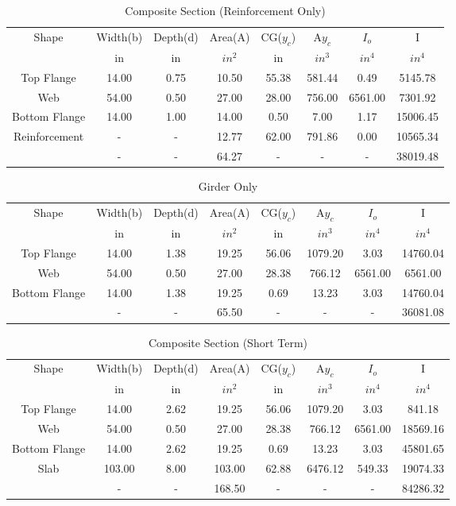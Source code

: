 \documentclass[11pt]{book}
\begin{document}
\begin{table}[H]
\centering
\caption{Composite Section (Reinforcement Only)}\begin{tabular}{|c|c|c|c|c|c|c|c|}
\hline
Shape &Width(b)     &Depth(d)  &Area(A)   &CG($y_c$)    &A$y_c$     &$I_o$    &I      \\
      &in           &in        &$in^2$    &in           &$in^3$     &$in^4$   &$in^4$  \\
\hline
Top Flange  &14.00 &0.75 &10.50 &55.38 &581.44 &0.49 &5145.78\\ \hline
Web  &54.00 &0.50 &27.00 &28.00 &756.00 &6561.00 &7301.92\\ \hline
Bottom Flange  &14.00 &1.00 &14.00 &0.50 &7.00 &1.17 &15006.45\\ \hline
Reinforcement &- &- &12.77 &62.00 &791.86 &0.00 &10565.34\\ \hline
  &- &- &64.27 &- &- &- &38019.48\\ \hline
\end{tabular}
\end{table}
\begin{table}[H]
\centering
\caption{Girder Only}\begin{tabular}{|c|c|c|c|c|c|c|c|}
\hline
Shape &Width(b)     &Depth(d)  &Area(A)   &CG($y_c$)    &A$y_c$     &$I_o$    &I      \\
      &in           &in        &$in^2$    &in           &$in^3$     &$in^4$   &$in^4$  \\
\hline
Top Flange  &14.00 &1.38 &19.25 &56.06 &1079.20 &3.03 &14760.04\\ \hline
Web  &54.00 &0.50 &27.00 &28.38 &766.12 &6561.00 &6561.00\\ \hline
Bottom Flange  &14.00 &1.38 &19.25 &0.69 &13.23 &3.03 &14760.04\\ \hline
  &- &- &65.50 &- &- &- &36081.08\\ \hline
\end{tabular}
\end{table}
\begin{table}[H]
\centering
\caption{Composite Section (Short Term)}\begin{tabular}{|c|c|c|c|c|c|c|c|}
\hline
Shape &Width(b)     &Depth(d)  &Area(A)   &CG($y_c$)    &A$y_c$     &$I_o$    &I      \\
      &in           &in        &$in^2$    &in           &$in^3$     &$in^4$   &$in^4$  \\
\hline
Top Flange  &14.00 &2.62 &19.25 &56.06 &1079.20 &3.03 &841.18\\ \hline
Web  &54.00 &0.50 &27.00 &28.38 &766.12 &6561.00 &18569.16\\ \hline
Bottom Flange  &14.00 &2.62 &19.25 &0.69 &13.23 &3.03 &45801.65\\ \hline
Slab &103.00 &8.00 &103.00 &62.88 &6476.12 &549.33 &19074.33\\ \hline
  &- &- &168.50 &- &- &- &84286.32\\ \hline
\end{tabular}
\end{table}
\end{document}

